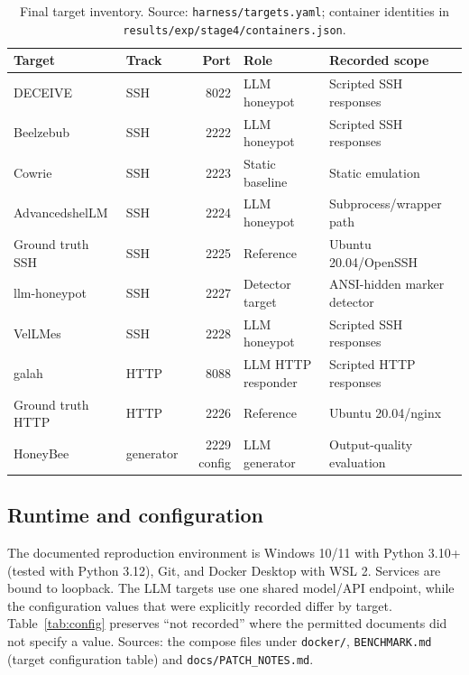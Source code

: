 \documentclass[a4paper,11pt]{article}
\begin{document}
\begin{table}[ht]
\centering
\caption{Final target inventory. Source: \texttt{harness/targets.yaml};
container identities in \texttt{results/exp/stage4/containers.json}.}
\label{tab:targets}
\small
\begin{tabularx}{\textwidth}{l l r l Y}
\toprule
Target & Track & Port & Role & Recorded scope \\
\midrule
DECEIVE & SSH & 8022 & LLM honeypot & Scripted SSH responses \\
Beelzebub & SSH & 2222 & LLM honeypot & Scripted SSH responses \\
Cowrie & SSH & 2223 & Static baseline & Static emulation \\
AdvancedshelLM & SSH & 2224 & LLM honeypot & Subprocess/wrapper path \\
Ground truth SSH & SSH & 2225 & Reference & Ubuntu 20.04/OpenSSH \\
llm-honeypot & SSH & 2227 & Detector target & ANSI-hidden marker detector \\
VelLMes & SSH & 2228 & LLM honeypot & Scripted SSH responses \\
galah & HTTP & 8088 & LLM HTTP responder & Scripted HTTP responses \\
Ground truth HTTP & HTTP & 2226 & Reference & Ubuntu 20.04/nginx \\
HoneyBee & generator & 2229 config & LLM generator & Output-quality evaluation \\
\bottomrule
\end{tabularx}
\end{table}

\subsection{Runtime and configuration}

The documented reproduction environment is Windows 10/11 with Python 3.10+
(tested with Python 3.12), Git, and Docker Desktop with WSL 2. Services are
bound to loopback. The LLM targets use one shared model/API endpoint, while
the configuration values that were explicitly recorded differ by target.
Table~\ref{tab:config} preserves ``not recorded'' where the permitted
documents did not specify a value. Sources: the compose files under
\texttt{docker/}, \texttt{BENCHMARK.md} (target configuration table) and
\texttt{docs/PATCH\_NOTES.md}.
\end{document}

